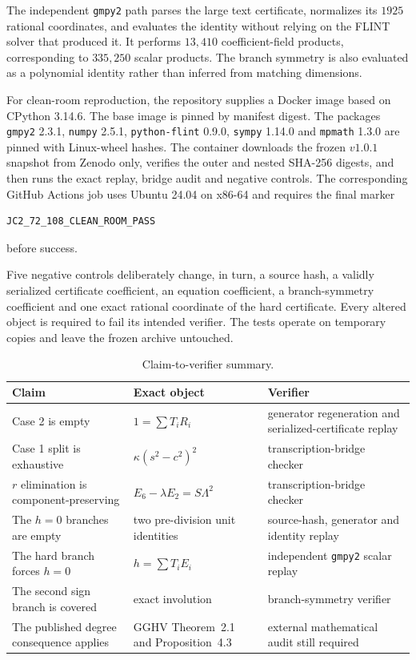 \documentclass[11pt,a4paper]{article}
\theoremstyle{remark}
\begin{document}
The independent \texttt{gmpy2} path parses the large text certificate, normalizes its $1925$ rational coordinates, and evaluates the identity without relying on the FLINT solver that produced it. It performs $13{,}410$ coefficient-field products, corresponding to $335{,}250$ scalar products. The branch symmetry is also evaluated as a polynomial identity rather than inferred from matching dimensions.

For clean-room reproduction, the repository supplies a Docker image based on CPython 3.14.6. The base image is pinned by manifest digest. The packages \texttt{gmpy2} 2.3.1, \texttt{numpy} 2.5.1, \texttt{python-flint} 0.9.0, \texttt{sympy} 1.14.0 and \texttt{mpmath} 1.3.0 are pinned with Linux-wheel hashes. The container downloads the frozen $v1.0.1$ snapshot from Zenodo only, verifies the outer and nested SHA-256 digests, and then runs the exact replay, bridge audit and negative controls. The corresponding GitHub Actions job uses Ubuntu 24.04 on x86-64 and requires the final marker
\begin{verbatim}
JC2_72_108_CLEAN_ROOM_PASS
\end{verbatim}
before success.

Five negative controls deliberately change, in turn, a source hash, a validly serialized certificate coefficient, an equation coefficient, a branch-symmetry coefficient and one exact rational coordinate of the hard certificate. Every altered object is required to fail its intended verifier. The tests operate on temporary copies and leave the frozen archive untouched.

\begin{table}[ht]
\centering
\caption{Claim-to-verifier summary.}
\small
\begin{tabularx}{\textwidth}{@{}>{\raggedright\arraybackslash}p{}>{\raggedright\arraybackslash}p{}>{\raggedright\arraybackslash}X@{}}
\toprule
Claim & Exact object & Verifier \\
\midrule
Case 2 is empty & $1=\sum T_iR_i$ & generator regeneration and serialized-certificate replay \\
Case 1 split is exhaustive & $\kappa(s^2-c^2)^2$ & transcription-bridge checker \\
$r$ elimination is component-preserving & $E_6-\lambda E_2=S\Lambda^2$ & transcription-bridge checker \\
The $h=0$ branches are empty & two pre-division unit identities & source-hash, generator and identity replay \\
The hard branch forces $h=0$ & $h=\sum T_iE_i$ & independent \texttt{gmpy2} scalar replay \\
The second sign branch is covered & exact involution & branch-symmetry verifier \\
The published degree consequence applies & GGHV Theorem~2.1 and Proposition~4.3 & external mathematical audit still required \\
\bottomrule
\end{tabularx}
\end{table}
\end{document}
